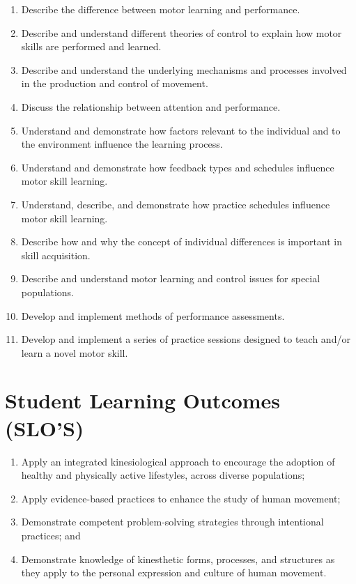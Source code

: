 \documentclass[11pt,]{article}
\providecommand{\tightlist}{%
  \setlength{\itemsep}{0pt}\setlength{\parskip}{0pt}}
\begin{document}
\begin{enumerate}
\def\labelenumi{\arabic{enumi}.}
\tightlist
\item
  Describe the difference between motor learning and performance.
\item
  Describe and understand different theories of control to explain how
  motor skills are performed and learned.
\item
  Describe and understand the underlying mechanisms and processes
  involved in the production and control of movement.
\item
  Discuss the relationship between attention and performance.
\item
  Understand and demonstrate how factors relevant to the individual and
  to the environment influence the learning process.
\item
  Understand and demonstrate how feedback types and schedules influence
  motor skill learning.
\item
  Understand, describe, and demonstrate how practice schedules influence
  motor skill learning.
\item
  Describe how and why the concept of individual differences is
  important in skill acquisition.
\item
  Describe and understand motor learning and control issues for special
  populations.
\item
  Develop and implement methods of performance assessments.
\item
  Develop and implement a series of practice sessions designed to teach
  and/or learn a novel motor skill.
\end{enumerate}

\hypertarget{student-learning-outcomes-slos}{%
\section{Student Learning Outcomes
(SLO'S)}\label{student-learning-outcomes-slos}}

\begin{enumerate}
\def\labelenumi{\arabic{enumi}.}
\tightlist
\item
  Apply an integrated kinesiological approach to encourage the adoption
  of healthy and physically active lifestyles, across diverse
  populations;
\item
  Apply evidence-based practices to enhance the study of human movement;
\item
  Demonstrate competent problem-solving strategies through intentional
  practices; and
\item
  Demonstrate knowledge of kinesthetic forms, processes, and structures
  as they apply to the personal expression and culture of human
  movement.
\end{enumerate}
\end{document}
